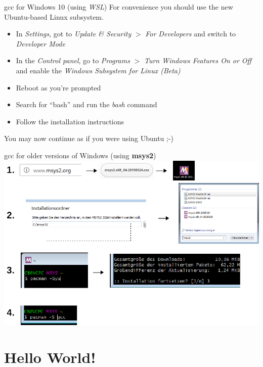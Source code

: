\documentclass[10pt,graphics,aspectratio=169,table]{beamer}
\begin{document}
\begin{frame}{gcc for Windows 10 (using \textit{WSL})}
	For convenience you should use the new Ubuntu-based Linux subsystem.\\
	\bigskip
	\begin{itemize}
		\item In \textit{Settings}, got to \textit{Update \& Security} $>$ \textit{For Developers}
			and switch to \textit{Developer Mode}
		\item In the \textit{Control panel}, go to \textit{Programs} $>$ \textit{Turn Windows Features On or Off}
			and enable the \textit{Windows Subsystem for Linux (Beta)}
		\item Reboot as you're prompted
		\item Search for ``bash'' and run the \textit{bash} command
		\item Follow the installation instructions
	\end{itemize}
	\bigskip
	You may now continue as if you were using Ubuntu ;-)
\end{frame}

\begin{frame}[fragile]{gcc for older versions of Windows (using \textbf{msys2})}
    \includegraphics[width=0.8\linewidth]{res/msys2_installation.png}
\end{frame}

\section{Hello World!}
\end{document}
